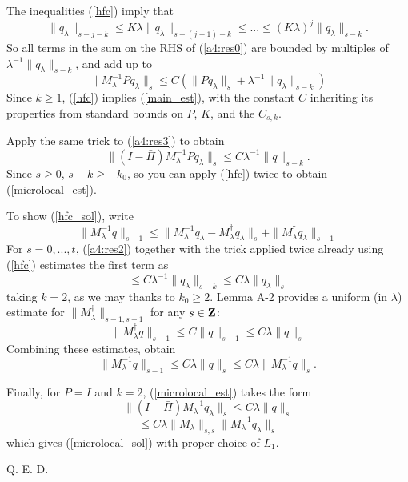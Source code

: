 The inequalities (\ref{hfc}) imply that 
\[
\|q_{\lambda}\|_{s-j-k} \le K \lambda \|q_{\lambda}\|_{s-(j-1)-k} \le ...\le (K\lambda)^{j} \|q_{\lambda}\|_{s-k}.
\]
So all terms in the sum on the RHS of (\ref{a4:res0}) are bounded by multiples of $\lambda^{-1}\|q_{\lambda}\|_{s-k}$, and add up to
\[
\|M_{\lambda}^{-1}Pq_{\lambda}\|_s \le C (\|Pq_{\lambda}\|_s + \lambda^{-1} \|q_{\lambda}\|_{s-k} )
\]
Since $k \ge 1$, (\ref{hfc}) implies (\ref{main_est}), with the constant $C$ inheriting its properties from standard bounds on $P$, $K$, and the $C_{s,k}$.

Apply the same trick to (\ref{a4:res3}) to obtain 
\[
\|(I-\bar{\Pi})M_{\lambda}^{-1}Pq_{\lambda}\|_s \le C
\lambda^{-1}\|q\|_{s-k}.
\]
Since $s \ge 0$, $s-k \ge -k_0$, so you can apply (\ref{hfc}) twice to obtain (\ref{microlocal_est}).

To show (\ref{hfc_sol}), write
\[
\|M_{\lambda}^{-1} q \|_{s-1} \le \|M_{\lambda}^{-1} q_{\lambda} - M_{\lambda}^{\dagger} q_{\lambda}\|_s + \|M_{\lambda}^{\dagger} q_{\lambda}\|_{s-1}
\]
For $s =0, ..., t$, (\ref{a4:res2}) together with the trick applied twice already using (\ref{hfc}) estimates the first term as
\[
\le  C \lambda^{-1}\|q_{\lambda}\|_{s-k} \le C \lambda \|q_{\lambda}\|_{s}
\]
taking $k=2$, as we may thanks to $k_0 \ge 2$. Lemma A-2 provides a uniform (in $\lambda$) estimate for $\|M_{\lambda}^{\dagger}\|_{s-1,s-1}$ for any $s \in {\bf Z}$: 
\[
\|M_{\lambda}^{\dagger} q\|_{s-1} \le C \|q\|_{s-1} \le C\lambda \|q\|_{s}
\]
Combining these estimates, obtain
\[
\|M_{\lambda}^{-1} q \|_{s-1} \le C \lambda \|q\|_{s} \le C\lambda \|M_{\lambda}^{-1} q \|_{s}.
\]

Finally, for $P=I$ and $k=2$, (\ref{microlocal_est}) takes the form
\[
\|(I-\bar{\Pi})M_{\lambda}^{-1}q_{\lambda}\|_s \le C \lambda\|q\|_{s}
\]
\[
\le C\lambda\|M_{\lambda}\|_{s,s}\|M_{\lambda}^{-1}q_{\lambda}\|_{s}
\]
which gives (\ref{microlocal_sol}) with proper choice of $L_1$.

Q. E. D.




